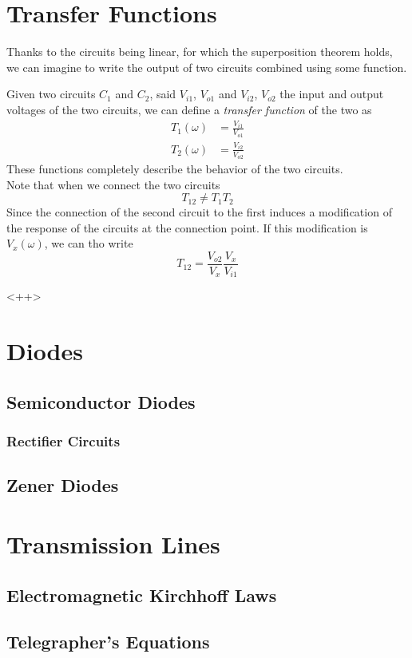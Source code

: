 \documentclass[../electromagnetism.tex]{subfiles}
\begin{document}
\section{Transfer Functions}
Thanks to the circuits being linear, for which the superposition theorem holds, we can imagine to write the output of two circuits combined using some function.
\begin{dfn}
	Given two circuits $C_1$ and $C_2$, said $V_{i1}$, $V_{o1}$ and $V_{i2}$, $V_{o2}$ the input and output voltages of the two circuits, we can define a \textit{transfer function} of the two as
	\begin{equation}
		\begin{aligned}
			T_{1}(\omega)&= \frac{V_{i1}}{V_{o1}}\\
			T_{2}(\omega)&= \frac{V_{i2}}{V_{o2}}
		\end{aligned}
		\label{eq:transferfuncdef.trf}
	\end{equation}
	These functions completely describe the behavior of the two circuits.\\
	Note that when we connect the two circuits
	\begin{equation*}
		T_{12}\ne T_1T_2
	\end{equation*}
	Since the connection of the second circuit to the first induces a modification of the response of the circuits at the connection point. If this modification is $V_x(\omega)$, we can tho write
	\begin{equation}
		T_{12}=\frac{V_{o2}}{V_{x}}\frac{V_x}{V_{i1}}
		\label{eq:transferfunc2.trf}
	\end{equation}
\end{dfn}
<++>
\section{Diodes}
\subsection{Semiconductor Diodes}
\subsubsection{Rectifier Circuits}
\subsection{Zener Diodes}
\section{Transmission Lines}
\subsection{Electromagnetic Kirchhoff Laws}
\subsection{Telegrapher's Equations}
\end{document}
